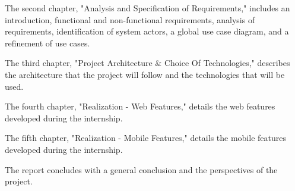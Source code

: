 The second chapter, "Analysis and Specification of Requirements," includes an introduction, functional and non-functional requirements, analysis of requirements, identification of system actors, a global use case diagram, and a refinement of use cases.

The third chapter, "Project Architecture \& Choice Of Technologies," describes the architecture that the project will follow and the technologies that will be used.

The fourth chapter, "Realization - Web Features," details the web features developed during the internship.

The fifth chapter, "Realization - Mobile Features," details the mobile features developed during the internship.

The report concludes with a general conclusion and the perspectives of the project.